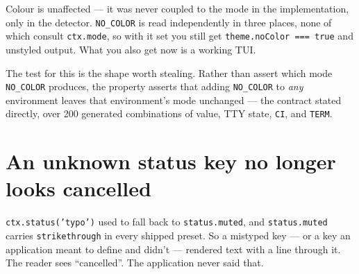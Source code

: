 Colour is unaffected --- it was never coupled to the mode in the implementation, only in the detector. \texttt{N\allowbreak{}O\allowbreak{}\_\allowbreak{}C\allowbreak{}O\allowbreak{}L\allowbreak{}O\allowbreak{}R} is read independently in three places, none of which consult \texttt{c\allowbreak{}t\allowbreak{}x\allowbreak{}.\allowbreak{}m\allowbreak{}o\allowbreak{}d\allowbreak{}e}, so with it set you still get \texttt{t\allowbreak{}h\allowbreak{}e\allowbreak{}m\allowbreak{}e\allowbreak{}.\allowbreak{}n\allowbreak{}o\allowbreak{}C\allowbreak{}o\allowbreak{}l\allowbreak{}o\allowbreak{}r\allowbreak{} \allowbreak{}=\allowbreak{}=\allowbreak{}=\allowbreak{} \allowbreak{}t\allowbreak{}r\allowbreak{}u\allowbreak{}e} and unstyled output. What you also get now is a working TUI.

The test for this is the shape worth stealing. Rather than assert which mode \texttt{N\allowbreak{}O\allowbreak{}\_\allowbreak{}C\allowbreak{}O\allowbreak{}L\allowbreak{}O\allowbreak{}R} produces, the property asserts that adding \texttt{N\allowbreak{}O\allowbreak{}\_\allowbreak{}C\allowbreak{}O\allowbreak{}L\allowbreak{}O\allowbreak{}R} to \emph{any} environment leaves that environment's mode unchanged --- the contract stated directly, over 200 generated combinations of value, TTY state, \texttt{C\allowbreak{}I}, and \texttt{T\allowbreak{}E\allowbreak{}R\allowbreak{}M}.

\section{An unknown status key no longer looks cancelled}\label{record-284-an-unknown-status-key-no-longer-looks-cancelled}

\texttt{c\allowbreak{}t\allowbreak{}x\allowbreak{}.\allowbreak{}s\allowbreak{}t\allowbreak{}a\allowbreak{}t\allowbreak{}u\allowbreak{}s\allowbreak{}(\allowbreak{}'\allowbreak{}t\allowbreak{}y\allowbreak{}p\allowbreak{}o\allowbreak{}'\allowbreak{})} used to fall back to \texttt{s\allowbreak{}t\allowbreak{}a\allowbreak{}t\allowbreak{}u\allowbreak{}s\allowbreak{}.\allowbreak{}m\allowbreak{}u\allowbreak{}t\allowbreak{}e\allowbreak{}d}, and \texttt{s\allowbreak{}t\allowbreak{}a\allowbreak{}t\allowbreak{}u\allowbreak{}s\allowbreak{}.\allowbreak{}m\allowbreak{}u\allowbreak{}t\allowbreak{}e\allowbreak{}d} carries \texttt{s\allowbreak{}t\allowbreak{}r\allowbreak{}i\allowbreak{}k\allowbreak{}e\allowbreak{}t\allowbreak{}h\allowbreak{}r\allowbreak{}o\allowbreak{}u\allowbreak{}g\allowbreak{}h} in every shipped preset. So a mistyped key --- or a key an application meant to define and didn't --- rendered text with a line through it. The reader sees ``cancelled''. The application never said that.

